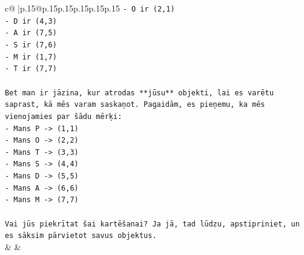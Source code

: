 \documentclass{article}
\begin{document}
{\begin{supertabular}{c@{$\;$}|p{.15\linewidth}@{}p{.15\linewidth}p{.15\linewidth}p{.15\linewidth}p{.15\linewidth}p{.15\linewidth}}
{{{\texttt{{-} O ir (2,1)} \\
\texttt{{-} D ir (4,3)} \\
\texttt{{-} A ir (7,5)} \\
\texttt{{-} S ir (7,6)} \\
\texttt{{-} M ir (1,7)} \\
\texttt{{-} T ir (7,7)} \\
\\ 
\texttt{Bet man ir jāzina, kur atrodas **jūsu** objekti, lai es varētu saprast, kā mēs varam saskaņot. Pagaidām, es pieņemu, ka mēs vienojamies par šādu mērķi:} \\
\texttt{{-} Mans P {-}> (1,1)} \\
\texttt{{-} Mans O {-}> (2,2)} \\
\texttt{{-} Mans T {-}> (3,3)} \\
\texttt{{-} Mans S {-}> (4,4)} \\
\texttt{{-} Mans D {-}> (5,5)} \\
\texttt{{-} Mans A {-}> (6,6)} \\
\texttt{{-} Mans M {-}> (7,7)} \\
\\ 
\texttt{Vai jūs piekrītat šai kartēšanai? Ja jā, tad lūdzu, apstipriniet, un es sāksim pārvietot savus objektus.} \\
            }
        }
    }
    & & \\ \\


\end{supertabular}}
\end{document}
